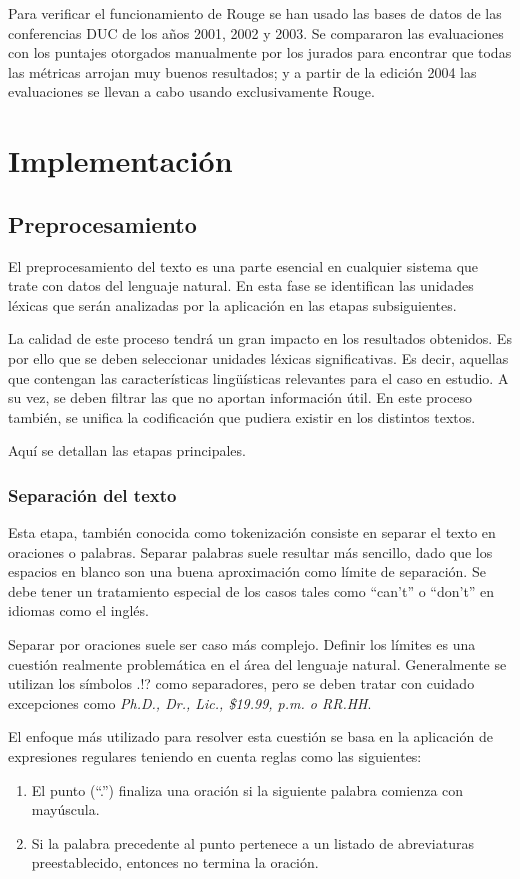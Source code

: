 \documentclass[a4paper]{article}
\begin{document}
Para verificar el funcionamiento de Rouge se han usado las bases de datos de las conferencias DUC de los años 2001, 2002 y 2003. Se compararon las evaluaciones con los puntajes otorgados manualmente por los jurados para encontrar que todas las métricas arrojan muy buenos resultados; y a partir de la edición 2004 las evaluaciones se llevan a cabo usando exclusivamente Rouge.


\section{Implementación}
\subsection{Preprocesamiento}
El preprocesamiento del texto es una parte esencial en cualquier sistema que trate con datos del lenguaje natural. En esta fase se identifican las unidades léxicas que serán analizadas por la aplicación en las etapas subsiguientes. 

La calidad de este proceso tendrá un gran impacto en los resultados obtenidos. Es por ello que se deben seleccionar unidades léxicas significativas. Es decir, aquellas que contengan las características lingüísticas relevantes para el caso en estudio. A su vez, se deben filtrar las que no aportan información útil. En este proceso también, se unifica la codificación que pudiera existir en los distintos textos.

Aquí se detallan las etapas principales.

\subsubsection{Separación del texto}
Esta etapa, también conocida como tokenización consiste en separar el texto en oraciones o palabras. Separar palabras suele resultar más sencillo, dado que los espacios en blanco son una buena aproximación como límite de separación. Se debe tener un tratamiento especial de los casos tales como “can’t” o “don’t” en idiomas como el inglés.

Separar por oraciones suele ser caso más complejo. Definir los límites es una cuestión realmente problemática en el área del lenguaje natural. Generalmente se utilizan los símbolos .!? como separadores, pero se deben tratar con cuidado excepciones como \textit{Ph.D., Dr., Lic., \$19.99, p.m. o RR.HH}.

El enfoque más utilizado para resolver esta cuestión se basa en la aplicación de expresiones regulares teniendo en cuenta reglas como las siguientes:
\begin{enumerate}
\item El punto (“.”) finaliza una oración si la siguiente palabra comienza con mayúscula.
\item Si la palabra precedente al punto pertenece a un listado de abreviaturas preestablecido, entonces no termina la oración.
\end{enumerate}
\end{document}
